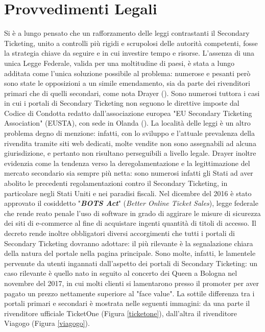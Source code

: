 \section{Provvedimenti Legali} \label{sec:legal}
Si è a lungo pensato che un rafforzamento delle leggi contrastanti il Secondary Ticketing, unito a controlli più rigidi e scrupolosi delle autorità competenti, fosse la strategia chiave da seguire e in cui investire tempo e risorse. 
L'assenza di una unica Legge Federale, valida per una moltitudine di paesi, è stata a lungo additata come l'unica soluzione possibile al problema: numerose e pesanti però sono state le opposizioni a un simile emendamento, sia da parte dei rivenditori primari che di quelli secondari, come nota Drayer (\cite{drayer2011examining}).
Sono numerosi tuttora i casi in cui i portali di Secondary Ticketing non seguono le direttive imposte dal Codice di Condotta redatto dall'associazione europea "EU Secondary Ticketing Association" (EUSTA), con sede in Olanda (\cite{phdthesis}). 
La località delle leggi è un altro problema degno di menzione: infatti, con lo sviluppo e l'attuale prevalenza della rivendita tramite siti web dedicati, molte vendite non sono assegnabili ad alcuna giurisdizione, e pertanto non risultano perseguibili a livello legale. 
Drayer inoltre evidenzia come la tendenza verso la deregolamentazione e la legittimazione del mercato secondario sia sempre più netta: sono numerosi infatti gli Stati ad aver abolito le precedenti regolamentazioni contro il Secondary Ticketing, in particolare negli Stati Uniti e nei paradisi fiscali. 
Nel dicembre del 2016 è stato approvato il cosiddetto "\textit{\textbf{BOTS Act}}" (\textit{Better Online Ticket Sales}), legge federale che rende reato penale l'uso di software in grado di aggirare le misure di sicurezza dei siti di e-commerce al fine di acquistare ingenti quantità di titoli di accesso. Il decreto rende inoltre obbligatori diversi accorgimenti che tutti i portali di Secondary Ticketing dovranno adottare: il più rilevante è la segnalazione chiara della natura del portale nella pagina principale. 
Sono molte, infatti, le lamentele pervenute da utenti ingannati dall'aspetto dei portali di Secondary Ticketing: un caso rilevante è quello nato in seguito al concerto dei Queen a Bologna nel novembre del 2017, in cui molti clienti si lamentarono presso il promoter per aver pagato un prezzo nettamente superiore al "face value".
La sottile differenza tra i portali primari e secondari è mostrata nelle seguenti immagini: da una parte il rivenditore ufficiale TicketOne (Figura \ref{ticketone}), dall'altra il rivenditore Viagogo (Figura \ref{viagogo}).
